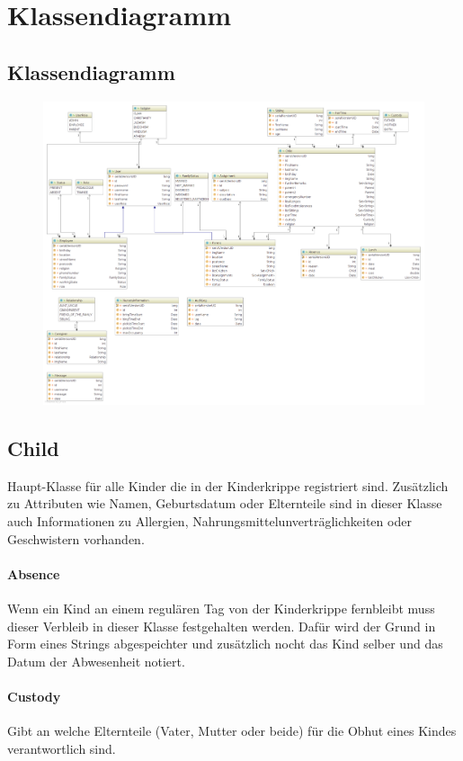 

\newpage
\section{Klassendiagramm}

 \subsection{Klassendiagramm}
 \begin{figure}[ht!]
  \includegraphics[width = 150mm]{pictures/class_diagram_intellij_bright.png}
 \end{figure}

\newpage
\subsection{Child}
	Haupt-Klasse für alle Kinder die in der Kinderkrippe registriert sind. Zusätzlich zu Attributen wie Namen, Geburtsdatum oder Elternteile sind in dieser Klasse auch Informationen zu Allergien, Nahrungsmittelunverträglichkeiten oder Geschwistern vorhanden. 
\paragraph{Absence}
	Wenn ein Kind an einem regulären Tag von der Kinderkrippe fernbleibt muss dieser Verbleib in dieser Klasse festgehalten werden. Dafür wird der Grund in Form eines Strings abgespeichter und zusätzlich nocht das Kind selber und das Datum der Abwesenheit notiert.
\paragraph{Custody}
	Gibt an welche Elternteile (Vater, Mutter oder beide) für die Obhut eines Kindes verantwortlich sind. 
